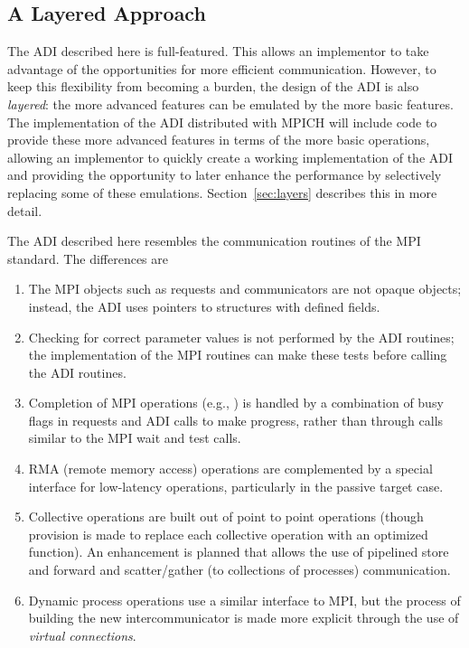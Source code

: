 \subsection{A Layered Approach}
The ADI described here is full-featured.  This allows an implementor
to take advantage of the opportunities for more efficient
communication.  However, to keep this flexibility from becoming a
burden, the design of the ADI is also \emph{layered}: the more
advanced features can be emulated by the more basic features.  The
implementation of the ADI distributed with MPICH will include code to
provide these more advanced features in terms of the more basic
operations, allowing an implementor to quickly create a working
implementation of the ADI and providing the opportunity to later
enhance the performance by selectively replacing some of these
emulations.  Section~\ref{sec:layers} describes this in more detail.

The ADI described here resembles the communication routines of the MPI
standard.  The differences are
\begin{enumerate}
\item The MPI objects such as requests and communicators are not
opaque objects; instead, the ADI uses pointers to structures with
defined fields.

\item Checking for correct parameter values is not performed by the
ADI routines; the implementation of the MPI routines can make these
tests before calling the ADI routines.

\item Completion of MPI operations (e.g., ) is handled
by a combination of busy flags in requests and ADI calls to make
progress, rather than through calls similar to the MPI wait and test
calls. 

\item RMA (remote memory access) operations are complemented by a
special interface for low-latency operations, particularly in the
passive target case.

\item Collective operations are built out of point to point operations
(though provision is made to replace each collective operation with an
optimized function).  An enhancement is planned that allows the use of
pipelined store and forward and scatter/gather (to collections of processes)
communication.  

\item Dynamic process operations use a similar interface to MPI, but the
process of building the new intercommunicator is made more explicit
through the use of \emph{virtual connections}.
\end{enumerate}

